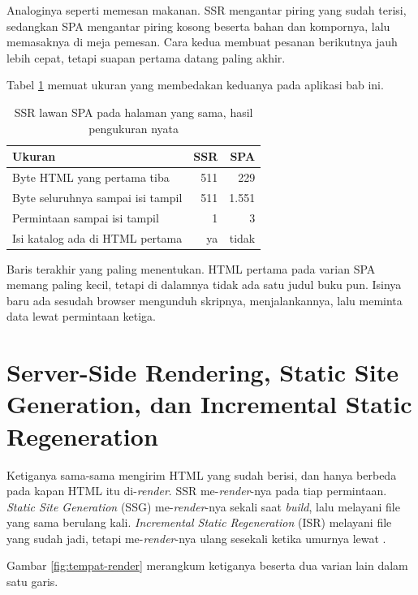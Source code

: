Analoginya seperti memesan makanan. SSR mengantar piring yang sudah terisi,
sedangkan SPA mengantar piring kosong beserta bahan dan kompornya, lalu
memasaknya di meja pemesan. Cara kedua membuat pesanan berikutnya jauh lebih
cepat, tetapi suapan pertama datang paling akhir.

Tabel \ref{tab:spa-ssr} memuat ukuran yang membedakan keduanya pada aplikasi
bab ini.

\begin{table}[!htb]
  \centering
  \caption{SSR lawan SPA pada halaman yang sama, hasil pengukuran nyata}
  \label{tab:spa-ssr}
  \begin{tabularx}{\textwidth}{Xrr}
    \hline
    \textbf{Ukuran} & \textbf{SSR} & \textbf{SPA} \\
    \hline
    Byte HTML yang pertama tiba & 511 & 229 \\
    \hline
    Byte seluruhnya sampai isi tampil & 511 & 1.551 \\
    \hline
    Permintaan sampai isi tampil & 1 & 3 \\
    \hline
    Isi katalog ada di HTML pertama & ya & tidak \\
    \hline
  \end{tabularx}
\end{table}

Baris terakhir yang paling menentukan. HTML pertama pada varian SPA memang
paling kecil, tetapi di dalamnya tidak ada satu judul buku pun. Isinya baru
ada sesudah browser mengunduh skripnya, menjalankannya, lalu meminta data
lewat permintaan ketiga.

\section[SSR, SSG, dan ISR]{Server-Side Rendering, Static Site
         Generation, dan Incremental Static Regeneration}

Ketiganya sama-sama mengirim HTML yang sudah berisi, dan hanya berbeda pada
kapan HTML itu di-\textit{render}. SSR me-\textit{render}-nya pada tiap permintaan.
\textit{Static Site Generation} (SSG) me-\textit{render}-nya sekali saat \textit{build},
lalu melayani file yang sama berulang kali. \textit{Incremental Static
Regeneration} (ISR) melayani file yang sudah jadi, tetapi me-\textit{render}-nya ulang
sesekali ketika umurnya lewat \cite{nextjs-isr}.

Gambar \ref{fig:tempat-render} merangkum ketiganya beserta dua varian lain
dalam satu garis.

